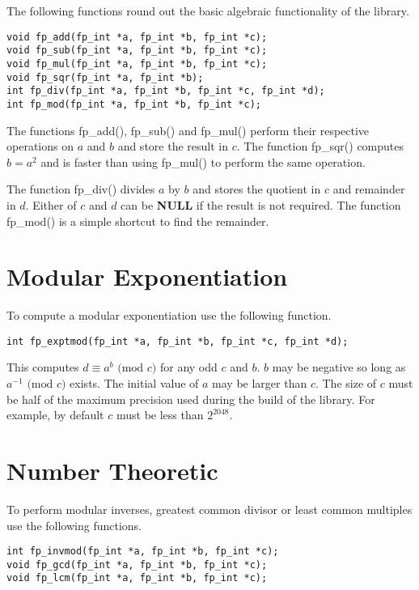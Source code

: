 \documentclass[b5paper]{book}
\begin{document}
The following functions round out the basic algebraic functionality of the library.

     
\begin{verbatim}
void fp_add(fp_int *a, fp_int *b, fp_int *c);
void fp_sub(fp_int *a, fp_int *b, fp_int *c);
void fp_mul(fp_int *a, fp_int *b, fp_int *c);
void fp_sqr(fp_int *a, fp_int *b);
int fp_div(fp_int *a, fp_int *b, fp_int *c, fp_int *d);
int fp_mod(fp_int *a, fp_int *b, fp_int *c);
\end{verbatim}

The functions fp\_add(), fp\_sub() and fp\_mul() perform their respective operations on $a$ and
$b$ and store the result in $c$.  The function fp\_sqr() computes $b = a^2$ and is faster than
using fp\_mul() to perform the same operation.

The function fp\_div() divides $a$ by $b$ and stores the quotient in $c$ and remainder in $d$.  Either 
of $c$ and $d$ can be \textbf{NULL} if the result is not required.  The function fp\_mod() is a simple 
shortcut to find the remainder.

\section{Modular Exponentiation}
To compute a modular exponentiation use the following function.

\begin{verbatim}
int fp_exptmod(fp_int *a, fp_int *b, fp_int *c, fp_int *d);
\end{verbatim}
This computes $d \equiv a^b \mbox{ (mod }c\mbox{)}$ for any odd $c$ and $b$.  $b$ may be negative so long as 
$a^{-1} \mbox{ (mod }c\mbox{)}$ exists.  The initial value of $a$ may be larger than $c$.  The size of $c$ must be 
half of the maximum precision used during the build of the library.  For example, by default $c$ must be less 
than $2^{2048}$.  

\section{Number Theoretic}

To perform modular inverses, greatest common divisor or least common multiples use the following
functions.

  
\begin{verbatim}
int fp_invmod(fp_int *a, fp_int *b, fp_int *c);
void fp_gcd(fp_int *a, fp_int *b, fp_int *c);
void fp_lcm(fp_int *a, fp_int *b, fp_int *c);
\end{verbatim}
\end{document}
